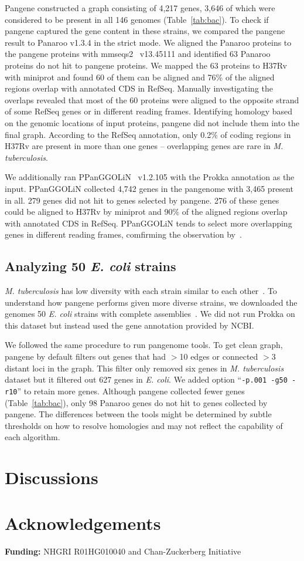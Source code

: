 \documentclass{bioinfo}
\begin{document}
Pangene constructed a graph consisting of 4,217 genes,
3,646 of which were considered to be present in all 146 genomes (Table~\ref{tab:bac}).
To check if pangene captured the gene content in these strains,
we compared the pangene result to Panaroo v1.3.4 in the strict mode.
We aligned the Panaroo proteins to the pangene proteins with mmseqs2~\citep{Steinegger:2017aa} v13.45111
and identified 63 Panaroo proteins do not hit to pangene proteins.
We mapped the 63 proteins to H37Rv with miniprot
and found 60 of them can be aligned
and 76\% of the aligned regions overlap with annotated CDS in RefSeq.
Manually investigating the overlaps revealed that most of the 60 proteins
were aligned to the opposite strand of some RefSeq genes or in different reading frames.
Identifying homology based on the genomic locations of input proteins,
pangene did not include them into the final graph.
According to the RefSeq annotation,
only 0.2\% of coding regions in H37Rv are present in more than one genes --
overlapping genes are rare in \emph{M. tuberculosis}.

We additionally ran PPanGGOLiN~\citep{Gautreau:2020aa} v1.2.105 with the Prokka annotation as the input.
PPanGGOLiN collected 4,742 genes in the pangenome with 3,465 present in all.
279 genes did not hit to genes selected by pangene.
276 of these genes could be aligned to H37Rv by miniprot
and 90\% of the aligned regions overlap with annotated CDS in RefSeq.
PPanGGOLiN tends to select more overlapping genes in different reading frames,
comfirming the observation by~\citet{Tonkin-Hill:2020aa}.

\subsection*{Analyzing 50 \emph{E. coli} strains}

\emph{M. tuberculosis} has low diversity with each strain similar to each other~\citep{Marin:2022aa}.
To understand how pangene performs given more diverse strains,
we downloaded the genomes 50 \emph{E. coli} strains with complete assemblies~\citep{Shaw:2021aa}.
We did not run Prokka on this dataset but instead used the gene annotation provided by NCBI.

We followed the same procedure to run pangenome tools.
To get clean graph, pangene by default filters out genes that had $>$10 edges or connected $>$3 distant loci in the graph.
This filter only removed six genes in \emph{M. tuberculosis} dataset but
it filtered out 627 genes in \emph{E. coli}.
We added option ``{\tt -p.001 -g50 -r10}'' to retain more genes.
Although pangene collected fewer genes (Table~\ref{tab:bac}),
only 98 Panaroo genes do not hit to genes collected by pangene.
The differences between the tools might be determined by subtle thresholds on how to resolve homologies
and may not reflect the capability of each algorithm.

\section*{Discussions}

\section*{Acknowledgements}

{\bf Funding:} NHGRI R01HG010040 and Chan-Zuckerberg Initiative


\end{document}
